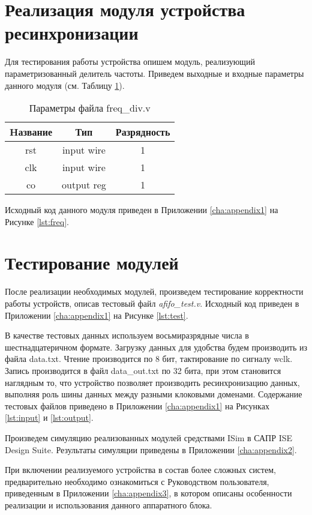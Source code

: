 \section{Реализация модуля устройства ресинхронизации}
Для тестирования работы устройства опишем модуль, реализующий параметризованный делитель частоты. Приведем выходные и входные параметры данного модуля (см. Таблицу \ref{tab:freq-params}).

\begin{table}[htbp]
	\caption{Параметры файла freq\_div.v}
	\centering
	\fontsize{12}{16pt}\selectfont
	\begin{tabular}{|c|c|c|}
		\hline
		\multicolumn{1}{|c}{\textbf{Hазвание}}& \multicolumn{1}{|c}{\textbf{Тип}} & \multicolumn{1}{|c|}{\textbf{Разрядность}} \\ \hline
		rst & input wire & 1 \\ \hline
		clk & input wire & 1 \\ \hline
		co & output reg & 1 \\ \hline
	\end{tabular}
	\label{tab:freq-params}
\end{table}

Исходный код данного модуля приведен в Приложении \ref{cha:appendix1} на Рисунке \ref{lst:freq}.

\section{Тестирование модулей}
После реализации необходимых модулей, произведем тестирование корректности работы устройств, описав тестовый файл \textit{afifo\_test.v}. Исходный код приведен в Приложении \ref{cha:appendix1} на Рисунке \ref{lst:test}.

В качестве тестовых данных используем восьмиразрядные числа в шестнадцатеричном формате. Загрузку данных для удобства будем производить из файла data.txt. Чтение производится по 8 бит, тактирование по сигналу wclk. Запись производится в файл data\_out.txt по 32 бита, при этом становится наглядным то, что устройство позволяет производить ресинхронизацию данных, выполняя роль шины данных между разными клоковыми доменами. Содержание тестовых файлов приведено в Приложении \ref{cha:appendix1} на Рисунках \ref{lst:input} и \ref{lst:output}.

Произведем симуляцию реализованных модулей средствами ISim в САПР ISE Design Suite. Результаты симуляции приведены в Приложении \ref{cha:appendix2}.

При включении реализуемого устройства в состав более сложных систем, предварительно необходимо ознакомиться с Руководством пользователя, приведенным в Приложении \ref{cha:appendix3}, в котором описаны особенности реализации и использования данного аппаратного блока.









